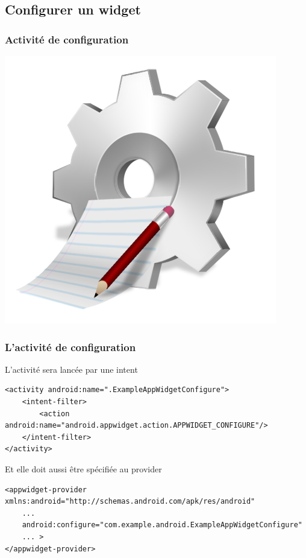 \documentclass{beamer}
\begin{document}
\subsection{Configurer un widget}
\begin{frame}
\frametitle{Activité de configuration}
\begin{center}
\includegraphics[scale=0.3]{config.png}
\end{center}
\end{frame}

\begin{frame}[fragile]
\frametitle{L'activité de configuration}
\begin{block}{L'activité sera lancée par une intent}
\lstset{language=xml}
\begin{lstlisting}
<activity android:name=".ExampleAppWidgetConfigure">
    <intent-filter>
        <action android:name="android.appwidget.action.APPWIDGET_CONFIGURE"/>
    </intent-filter>
</activity>
\end{lstlisting}
\end{block}
\begin{block}{Et elle doit aussi être spécifiée au provider}
\begin{lstlisting}
<appwidget-provider xmlns:android="http://schemas.android.com/apk/res/android"
    ...
    android:configure="com.example.android.ExampleAppWidgetConfigure" 
    ... >
</appwidget-provider>
\end{lstlisting}
\end{block}
\end{frame}
\end{document}
